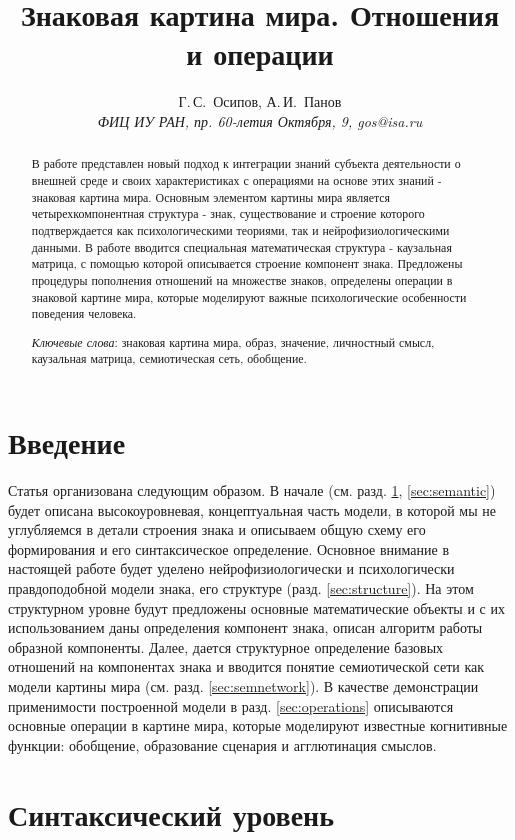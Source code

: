 \documentclass[12pt]{scrartcl}
\title{Знаковая картина мира. Отношения и операции}
\author{Г.\,С.~Осипов, А.\,И.~Панов\\
	{\large\slshape ФИЦ ИУ РАН, пр. 60-летия Октября, 9, gos@isa.ru}}
\begin{document}
	
	\maketitle{}
	\begin{abstract}
		В работе представлен новый подход к интеграции знаний субъекта деятельности о внешней среде и своих характеристиках с операциями на основе этих знаний - знаковая картина мира. Основным элементом картины мира является четырехкомпонентная структура - знак, существование и строение которого подтверждается как психологическими теориями, так и нейрофизиологическими данными. В работе вводится специальная математическая структура - каузальная матрица, с помощью которой описывается строение компонент знака. Предложены процедуры пополнения отношений на множестве знаков, определены операции в знаковой картине мира, которые моделируют важные психологические особенности поведения человека.
		\par\bigskip
		\textit{Ключевые слова}: знаковая картина мира, образ, значение, личностный смысл, каузальная матрица, семиотическая сеть, обобщение.
	\end{abstract}
	
	
	\section*{Введение}
	
	
	Статья организована следующим образом. В начале (см. разд. \ref{sec:sintaxis}, \ref{sec:semantic}) будет описана высокоуровневая, концептуальная часть модели, в которой мы не углубляемся в детали строения знака и описываем общую схему его формирования и его синтаксическое определение. Основное внимание в настоящей работе будет уделено нейрофизиологически и психологически правдоподобной модели знака, его структуре (разд. \ref{sec:structure}). На этом структурном уровне будут предложены основные математические объекты и с их использованием даны определения компонент знака, описан алгоритм работы образной компоненты. Далее, дается структурное определение базовых отношений на компонентах знака и вводится понятие семиотической сети как модели картины мира (см. разд. \ref{sec:semnetwork}). В качестве демонстрации применимости построенной модели в разд. \ref{sec:operations} описываются основные операции в картине мира, которые моделируют известные когнитивные функции: обобщение, образование сценария и агглютинация смыслов.
	
	\section{Синтаксический уровень}\label{sec:sintaxis}
\end{document}
